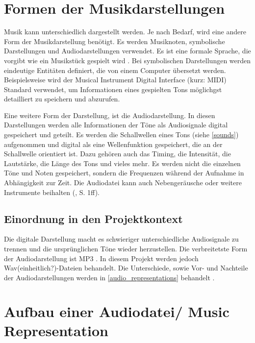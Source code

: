 %
\section{Formen der Musikdarstellungen}
%

Musik kann unterschiedlich dargestellt werden. Je nach Bedarf, wird eine andere Form der Musikdarstellung benötigt. Es werden Musiknoten, symbolische Darstellungen und Audiodarstellungen verwendet. Es ist eine formale Sprache, die vorgibt wie ein Musikstück gespielt wird \parencite{sheet_music_representations}. Bei symbolischen Darstellungen werden eindeutige Entitäten definiert, die von einem Computer übersetzt werden. Beispielsweise wird der Musical Instrument Digital Interface (kurz: MIDI) Standard verwendet, um Informationen eines gespielten Tons möglichgst detailliert zu speichern und abzurufen.

\par

Eine weitere Form der Darstellung, ist die Audiodarstellung. In diesen Darstellungen werden alle Informationen der Töne als Audiosignale digital gespeichert und geteilt. Es werden die Schallwellen eines Tons (siehe \cref{sounds}) aufgenommen und digital als eine Wellenfunktion gespeichert, die an der Schallwelle orientiert ist. Dazu gehören auch das Timing, die Intensität, die Lautstärke, die Länge des Tons und vieles mehr. Es werden nicht die einzelnen Töne und Noten gespeichert, sondern die Frequenzen während der Aufnahme in Abhängigkeit zur Zeit. Die Audiodatei kann auch Nebengeräusche oder weitere Instrumente beihalten (\cite{fundamentals_of_music_processing}, S. 1ff).

\subsection{Einordnung in den Projektkontext}

Die digitale Darstellung macht es schwieriger unterschiedliche Audiosignale zu trennen und die ursprünglichen Töne wieder herzustellen. Die verbreitetste Form der Audiodarstellung ist MP3 \parencite{mp3_most_popular}. In diesem Projekt werden jedoch Wav(einheitlich?)-Dateien behandelt. Die Unterschiede, sowie Vor- und Nachteile der Audiodarstellungen werden in \cref{audio_representations} behandelt \parencite{fundamentals_of_music_processing}.

%
\section{Aufbau einer Audiodatei/ Music Representation}
%

